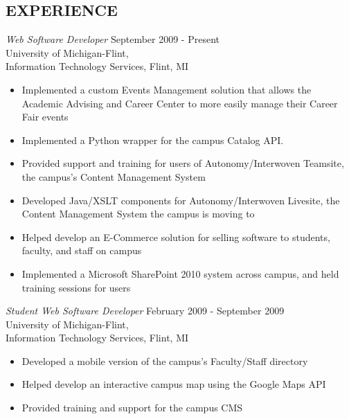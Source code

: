 \documentclass[line,margin]{res}
\begin{document}
\begin{resume}
\section{EXPERIENCE}
    {\sl Web Software Developer }
            \hfill September 2009 - Present \\
                   University of Michigan-Flint, \\
                   Information Technology Services, Flint, MI
        \vspace{2 mm}
        \begin{itemize}
            \item Implemented a custom Events Management solution that
                  allows the Academic Advising and Career Center to
                  more easily manage their Career Fair events
			\item Implemented a Python wrapper for the campus Catalog API.
            \item Provided support and training for users of Autonomy/Interwoven
                  Teamsite, the campus's Content Management System
            \item Developed Java/XSLT components for Autonomy/Interwoven Livesite, the
                  Content Management System the campus is moving to
            \item Helped develop an E-Commerce solution for selling software
                  to students, faculty, and staff on campus
            \item Implemented a Microsoft SharePoint 2010 system across
                  campus, and held training sessions for users \\
        \end{itemize}

    {\sl Student Web Software Developer }
            \hfill February 2009 - September 2009 \\
                   University of Michigan-Flint, \\
                   Information Technology Services, Flint, MI
        \vspace{2 mm}
        \begin{itemize}
            \item Developed a mobile version of the campus's Faculty/Staff
                  directory
            \item Helped develop an interactive campus map using the
                  Google Maps API
            \item Provided training and support for the campus CMS
        \end{itemize}


\end{resume}
\end{document}
